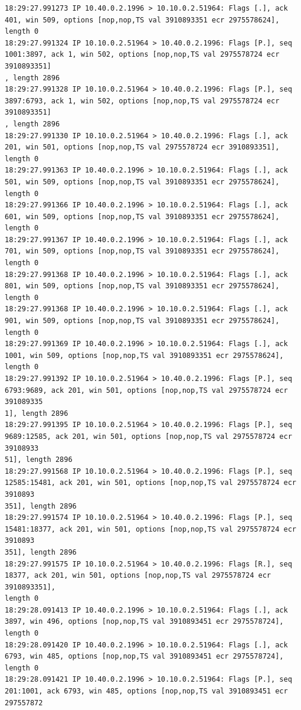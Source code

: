 \documentclass[a4paper,12pt]{article}
\begin{document}
\begin{Verbatim}
18:29:27.991273 IP 10.40.0.2.1996 > 10.10.0.2.51964: Flags [.], ack 401, win 509, options [nop,nop,TS val 3910893351 ecr 2975578624], length 0
18:29:27.991324 IP 10.10.0.2.51964 > 10.40.0.2.1996: Flags [P.], seq 1001:3897, ack 1, win 502, options [nop,nop,TS val 2975578724 ecr 3910893351]
, length 2896
18:29:27.991328 IP 10.10.0.2.51964 > 10.40.0.2.1996: Flags [P.], seq 3897:6793, ack 1, win 502, options [nop,nop,TS val 2975578724 ecr 3910893351]
, length 2896
18:29:27.991330 IP 10.10.0.2.51964 > 10.40.0.2.1996: Flags [.], ack 201, win 501, options [nop,nop,TS val 2975578724 ecr 3910893351], length 0
18:29:27.991363 IP 10.40.0.2.1996 > 10.10.0.2.51964: Flags [.], ack 501, win 509, options [nop,nop,TS val 3910893351 ecr 2975578624], length 0
18:29:27.991366 IP 10.40.0.2.1996 > 10.10.0.2.51964: Flags [.], ack 601, win 509, options [nop,nop,TS val 3910893351 ecr 2975578624], length 0
18:29:27.991367 IP 10.40.0.2.1996 > 10.10.0.2.51964: Flags [.], ack 701, win 509, options [nop,nop,TS val 3910893351 ecr 2975578624], length 0
18:29:27.991368 IP 10.40.0.2.1996 > 10.10.0.2.51964: Flags [.], ack 801, win 509, options [nop,nop,TS val 3910893351 ecr 2975578624], length 0
18:29:27.991368 IP 10.40.0.2.1996 > 10.10.0.2.51964: Flags [.], ack 901, win 509, options [nop,nop,TS val 3910893351 ecr 2975578624], length 0
18:29:27.991369 IP 10.40.0.2.1996 > 10.10.0.2.51964: Flags [.], ack 1001, win 509, options [nop,nop,TS val 3910893351 ecr 2975578624], length 0
18:29:27.991392 IP 10.10.0.2.51964 > 10.40.0.2.1996: Flags [P.], seq 6793:9689, ack 201, win 501, options [nop,nop,TS val 2975578724 ecr 391089335
1], length 2896
18:29:27.991395 IP 10.10.0.2.51964 > 10.40.0.2.1996: Flags [P.], seq 9689:12585, ack 201, win 501, options [nop,nop,TS val 2975578724 ecr 39108933
51], length 2896
18:29:27.991568 IP 10.10.0.2.51964 > 10.40.0.2.1996: Flags [P.], seq 12585:15481, ack 201, win 501, options [nop,nop,TS val 2975578724 ecr 3910893
351], length 2896
18:29:27.991574 IP 10.10.0.2.51964 > 10.40.0.2.1996: Flags [P.], seq 15481:18377, ack 201, win 501, options [nop,nop,TS val 2975578724 ecr 3910893
351], length 2896
18:29:27.991575 IP 10.10.0.2.51964 > 10.40.0.2.1996: Flags [R.], seq 18377, ack 201, win 501, options [nop,nop,TS val 2975578724 ecr 3910893351],
length 0
18:29:28.091413 IP 10.40.0.2.1996 > 10.10.0.2.51964: Flags [.], ack 3897, win 496, options [nop,nop,TS val 3910893451 ecr 2975578724], length 0
18:29:28.091420 IP 10.40.0.2.1996 > 10.10.0.2.51964: Flags [.], ack 6793, win 485, options [nop,nop,TS val 3910893451 ecr 2975578724], length 0
18:29:28.091421 IP 10.40.0.2.1996 > 10.10.0.2.51964: Flags [P.], seq 201:1001, ack 6793, win 485, options [nop,nop,TS val 3910893451 ecr 297557872

\end{Verbatim}
\end{document}
